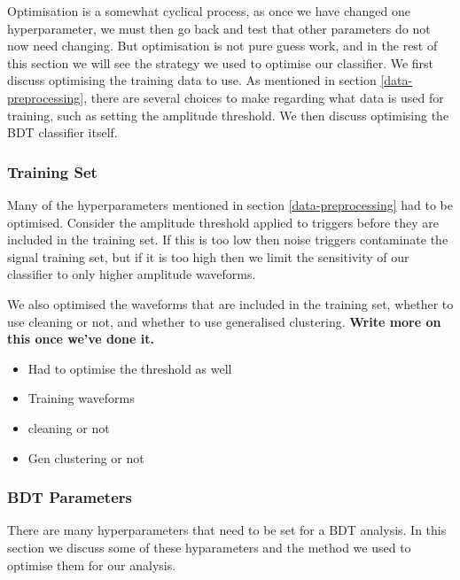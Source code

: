 \documentclass[11pt]{cuthesis}
\begin{document}
Optimisation is a somewhat cyclical process, as once we have changed one hyperparameter, we must then go back and test that other parameters do not now need changing. But optimisation is not pure guess work, and in the rest of this section we will see the strategy we used to optimise our classifier. We first discuss optimising the training data to use. As mentioned in section \ref{data-preprocessing}, there are several choices to make regarding what data is used for training, such as setting the amplitude threshold. We then discuss optimising the BDT classifier itself. 

\subsubsection{Training Set}
Many of the hyperparameters mentioned in section \ref{data-preprocessing} had to be optimised. Consider the amplitude threshold applied to triggers before they are included in the training set. If this is too low then noise triggers contaminate the signal training set, but if it is too high then we limit the sensitivity of our classifier to only higher amplitude waveforms. 

We also optimised the waveforms that are included in the training set, whether to use cleaning or not, and whether to use generalised clustering. \textbf{Write more on this once we've done it.}



\begin{itemize}
\item Had to optimise the threshold as well
\item Training waveforms
\item cleaning or not
\item Gen clustering or not
\end{itemize}

\subsubsection{BDT Parameters}
There are many hyperparameters that need to be set for a BDT analysis. In this section we discuss some of these hyparameters and the method we used to optimise them for our analysis. 
\end{document}
